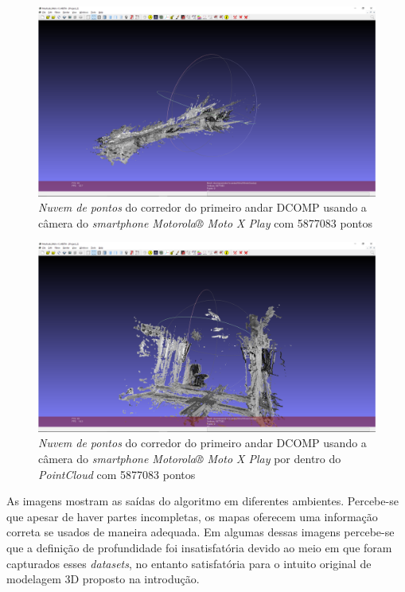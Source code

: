\begin{figure}[H]
	\centering
		\includegraphics[width= \textwidth]{Imagens/corredorMotox.PNG}
	\caption{\textit{Nuvem de pontos} do corredor do primeiro andar DCOMP usando a câmera do \textit{smartphone Motorola® Moto X Play} com 5877083 pontos}
\end{figure}

\begin{figure}[H]
	\centering
		\includegraphics[width= \textwidth]{Imagens/corredorMotoxdentro.PNG}
	\caption{\textit{Nuvem de pontos} do corredor do primeiro andar DCOMP usando a câmera do \textit{smartphone Motorola® Moto X Play} por dentro do \textit{PointCloud} com 5877083 pontos}
\end{figure}

As imagens mostram as saídas do algoritmo em diferentes ambientes. Percebe-se que apesar de haver partes incompletas, os mapas oferecem uma informação correta se usados de maneira adequada. Em algumas dessas imagens percebe-se que a definição de profundidade foi insatisfatória devido ao meio em que foram capturados esses \textit{datasets}, no entanto satisfatória para o intuito original de modelagem 3D proposto na introdução.


